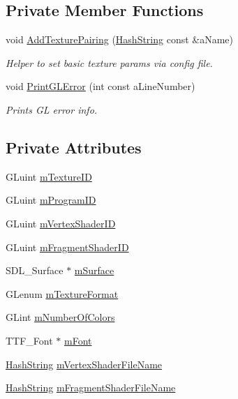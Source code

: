 \subsection*{Private Member Functions}
\begin{DoxyCompactItemize}
\item 
void \hyperlink{classPCShaderSurface_a1456554f76a75401d2760738b171d4ea}{Add\+Texture\+Pairing} (\hyperlink{classHashString}{Hash\+String} const \&a\+Name)
\begin{DoxyCompactList}\small\item\em Helper to set basic texture params via config file. \end{DoxyCompactList}\item 
void \hyperlink{classPCShaderSurface_a552bb03ecd2e74585af0cf626f82542f}{Print\+G\+L\+Error} (int const a\+Line\+Number)
\begin{DoxyCompactList}\small\item\em Prints GL error info. \end{DoxyCompactList}\end{DoxyCompactItemize}
\subsection*{Private Attributes}
\begin{DoxyCompactItemize}
\item 
G\+Luint \hyperlink{classPCShaderSurface_af7a4c9392ee2ef0bf836e97648b4112e}{m\+Texture\+ID}
\item 
G\+Luint \hyperlink{classPCShaderSurface_a9cee47a14a865a5061ef5d486a4e604b}{m\+Program\+ID}
\item 
G\+Luint \hyperlink{classPCShaderSurface_a8d0fd2eafcceb4765cea47ea67190467}{m\+Vertex\+Shader\+ID}
\item 
G\+Luint \hyperlink{classPCShaderSurface_ac719340038040dd0f3261858b39eaf90}{m\+Fragment\+Shader\+ID}
\item 
S\+D\+L\+\_\+\+Surface $\ast$ \hyperlink{classPCShaderSurface_a18c859f930b006b872c7fcb01061a95e}{m\+Surface}
\item 
G\+Lenum \hyperlink{classPCShaderSurface_ab594b2e8b076bf2bfce19c4b63ec002a}{m\+Texture\+Format}
\item 
G\+Lint \hyperlink{classPCShaderSurface_a728c8c2df9e984222a81284428c3bdfa}{m\+Number\+Of\+Colors}
\item 
T\+T\+F\+\_\+\+Font $\ast$ \hyperlink{classPCShaderSurface_a9f29a380adefffa842169f30bb8c70a4}{m\+Font}
\item 
\hyperlink{classHashString}{Hash\+String} \hyperlink{classPCShaderSurface_a6b0d831f9fdea915e3f0a0326e8dbf88}{m\+Vertex\+Shader\+File\+Name}
\item 
\hyperlink{classHashString}{Hash\+String} \hyperlink{classPCShaderSurface_ad6a28307d37dd3ae978f6d9ad7871ecd}{m\+Fragment\+Shader\+File\+Name}
\end{DoxyCompactItemize}
